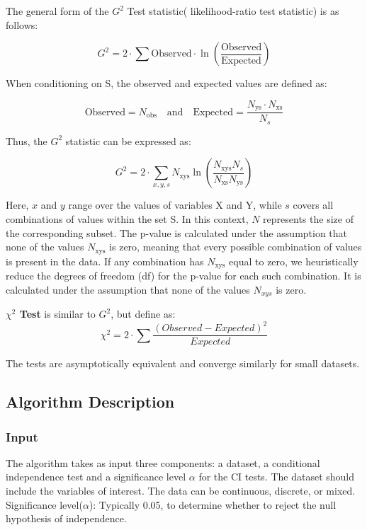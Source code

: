 \documentclass[main.tex]{subfiles}
\begin{document}
The general form of the $ G^2 $ Test statistic( likelihood-ratio test statistic) is as follows:

\[
G^2 = 2 \cdot \sum \text{Observed} \cdot \ln \left( \frac{\text{Observed}}{\text{Expected}} \right)
\]

When conditioning on S, the observed and expected values are defined as:

\[
\text{Observed} = N_{\text{obs}} \quad \text{and} \quad \text{Expected} = \frac{N_{\text{ys}} \cdot N_{\text{xs}}}{N_s}
\]

Thus, the $ G^2 $ statistic can be expressed as:

\[
G^2 = 2 \cdot \sum_{x,y,s} N_{\text{xys}} \ln \left( \frac{N_{\text{xys}} N_s}{N_{\text{xs}} N_{\text{ys}}} \right)
\]

Here, $ x $ and $ y $ range over the values of variables X and Y, while $ s $ covers all combinations of values within the set S. In this context, $ N $ represents the size of the corresponding subset. The p-value is calculated under the assumption that none of the values $ N_{\text{xys}} $ is zero, meaning that every possible combination of values is present in the data. If any combination has $ N_{\text{xys}} $ equal to zero, we heuristically reduce the degrees of freedom (df) for the p-value for each such combination. It is calculated under the assumption that none of the values $N_{xys}$ is zero. 

\textbf{$ \chi^2 $ Test} is similar to $G^2$, but define as:
\[\chi ^2 = 2 \cdot \sum \frac{(Observed - Expected)^2}{Expected}\]

The tests are asymptotically equivalent and converge similarly for small datasets.

\subsection{Algorithm Description}
\subsubsection{Input}
The algorithm takes as input three components: a dataset, a conditional independence test and a significance level $\alpha$ for the CI tests. The dataset should include the variables of interest. The data can be continuous, discrete, or mixed.
Significance level($\alpha$): Typically 0.05, to determine whether to reject the null hypothesis of independence.
\end{document}
